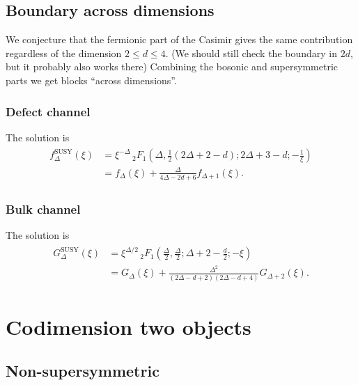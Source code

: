 \documentclass[letterpaper]{article}
\let\Oldsection\section
\renewcommand{\section}{\FloatBarrier\Oldsection}
\let\Oldsubsection\subsection
\renewcommand{\subsection}{\FloatBarrier\Oldsubsection}
\let\Oldsubsubsection\subsubsection
\renewcommand{\subsubsection}{\FloatBarrier\Oldsubsubsection}
\begin{document}
\subsection{Boundary across dimensions}

We conjecture that the fermionic part of the Casimir gives the same contribution regardless of the dimension $2 \le d \le 4$. 
(We should still check the boundary in $2d$, but it probably also works there)
Combining the bosonic and supersymmetric parts we get blocks ``across dimensions''.

\subsubsection{Defect channel}

The solution is
\begin{align}
\begin{split}
 f_\Delta^{\text{SUSY}}(\xi) 
 & = \xi ^{-\Delta } \, _2F_1\left(\Delta ,\frac{1}{2} (2 \Delta + 2-d);2 \Delta +3-d;-\frac{1}{\xi }\right) \\
 & = f_\Delta(\xi) + \frac{\Delta }{4\Delta - 2d + 6} f_{\Delta+1}(\xi).
\end{split}
\end{align}


\subsubsection{Bulk channel}

The solution is
\begin{align}
\begin{split}
 G_\Delta^{\text{SUSY}}(\xi) 
 & = \xi ^{\Delta /2} \, _2F_1\left(\frac{\Delta }{2},\frac{\Delta }{2};\Delta +2 -\frac{d}{2};-\xi \right) \\
 & = G_\Delta(\xi) 
   + \frac{\Delta ^2}{(2 \Delta -d +2) (2 \Delta -d +4)} G_{\Delta+2}(\xi).
\end{split}
\end{align}

\section{Codimension two objects}

\subsection{Non-supersymmetric}
\end{document}
